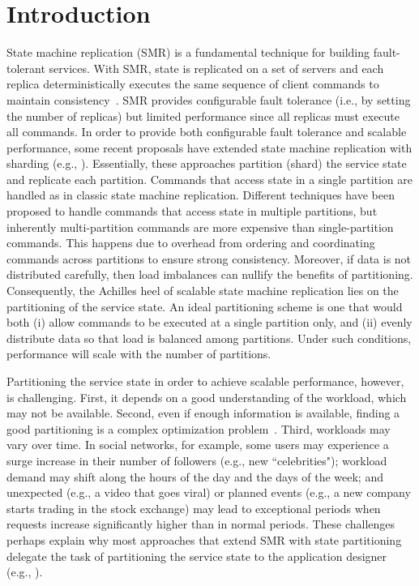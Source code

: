 \section{Introduction}

State machine replication (SMR) is a fundamental technique for building fault-tolerant services. 
With SMR, state is replicated on a set of servers and each replica deterministically executes the same sequence of client commands to maintain consistency~\cite{Lam78,Sch90}. 
SMR provides configurable fault tolerance (i.e., by setting the number of replicas) but limited performance since all replicas must execute all commands.
%
In order to provide both configurable fault tolerance and scalable performance, some recent proposals have extended state machine replication with sharding (e.g., \cite{Aguilera:2007, bezerra2014ssmr,corbett2013spanner,Glendenning:2011kj,
  bli16edcc}).
Essentially, these approaches partition (shard) the service state and replicate each partition.
Commands that access state in a single partition are handled as in classic state machine replication.
Different techniques have been proposed to handle commands that access state in multiple partitions, but inherently multi-partition commands are more expensive than single-partition commands.
This happens due to overhead from ordering and coordinating commands across partitions to ensure strong consistency.
Moreover, if data is not distributed carefully, then load imbalances can nullify the benefits of partitioning. 
Consequently, the Achilles heel of scalable state machine replication lies on the partitioning of the service state.
An ideal partitioning scheme is one that would both (i) allow commands to be executed at a single partition only, and (ii) evenly distribute data so that load is balanced among partitions.
Under such conditions, performance will scale with the number of partitions.

Partitioning the service state in order to achieve scalable performance, however, is challenging.
First, it depends on a good understanding of the workload, which may not be available.
Second, even if enough information is available, finding a good partitioning is a complex optimization problem~\cite{curino2010sch,taft2014est}. 
Third, workloads may vary over time. 
In social networks, for example, some users may experience a surge increase in their number of followers (e.g., new ``celebrities"); workload demand may shift along the hours of the day and the days of the week; and unexpected (e.g., a video that goes viral) or planned events (e.g., a new company starts trading in the stock exchange) may lead to exceptional periods when requests increase significantly higher than in normal periods.
These challenges perhaps explain why most approaches that extend SMR with state partitioning delegate the task of partitioning the service state to the application designer (e.g., \cite{Aguilera:2007, bezerra2014ssmr,corbett2013spanner,bli16edcc}).

